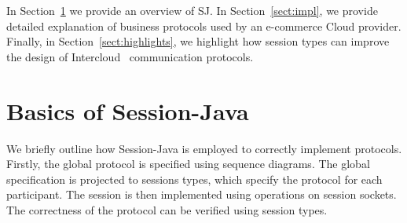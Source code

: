 \documentclass{llncs}
\begin{document}


In Section~\ref{sect:basics} we provide an overview of SJ.
In Section~\ref{sect:impl}, we provide detailed explanation of business protocols used by an e-commerce Cloud provider.
Finally, in Section~\ref{sect:highlights}, we highlight how session types can improve the design of Intercloud~\cite{intercloud} communication protocols.


\section{Basics of Session-Java}
\label{sect:basics}

We briefly outline how Session-Java is employed to correctly implement protocols.
Firstly, the global protocol is specified using sequence diagrams. The global specification is projected to sessions types, which specify the protocol for each participant.
The session is then implemented using operations on session sockets. The correctness of the protocol can be verified using session types.

\end{document}
